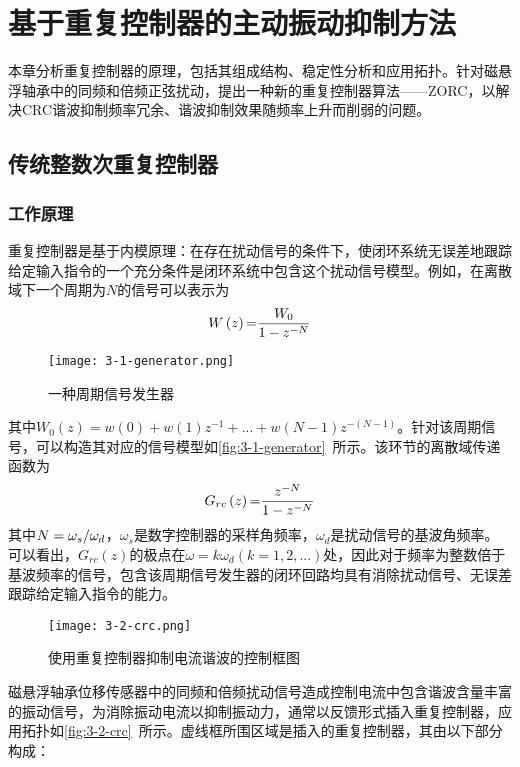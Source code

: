 \documentclass[
  lang=cn,
  degree=master,
  openany,oneside
]{nuaathesis}
\begin{document}
\chapter{基于重复控制器的主动振动抑制方法}
本章分析重复控制器的原理，包括其组成结构、稳定性分析和应用拓扑。针对磁悬浮轴承中的同频和倍频正弦扰动，提出一种新的重复控制器算法——ZORC，以解决CRC谐波抑制频率冗余、谐波抑制效果随频率上升而削弱的问题。

\section{传统整数次重复控制器}
\subsection{工作原理}
重复控制器是基于内模原理\cite{francis1975internal}：在存在扰动信号的条件下，使闭环系统无误差地跟踪给定输入指令的一个充分条件是闭环系统中包含这个扰动信号模型。例如，在离散域下一个周期为$N$的信号可以表示为
\begin{equation}
\label{eq3-1}
W\left( z \right){\rm{ = }}{{{W_0}} \over {1 - {z^{ - N}}}}
\end{equation}
\begin{figure}[h!]
	\texttt{[image: 3-1-generator.png]}
	\caption{一种周期信号发生器}
	\label{fig:3-1-generator}
\end{figure}
其中${W_0}\left( z \right) = w\left( 0 \right) + w\left( 1 \right){z^{ - 1}} + ... + w\left( {N - 1} \right){z^{ - \left( {N - 1} \right)}}$。针对该周期信号，可以构造其对应的信号模型如\autoref{fig:3-1-generator}~所示。该环节的离散域传递函数为
\begin{equation}
\label{eq3-2}
{G_{rc}}\left( z \right){\rm{ = }}{{{z^{ - N}}} \over {1 - {z^{ - N}}}}
\end{equation}
其中$N = {{{\omega _s}} \mathord{\left/
 {\vphantom {{{\omega _s}} {{\omega _d}}}} \right.
 \kern-\nulldelimiterspace} {{\omega _d}}}$，$\omega _s$是数字控制器的采样角频率，$\omega _d$是扰动信号的基波角频率。可以看出，$G_{rc}(z)$的极点在$\omega = k\omega_d(k = 1,2,...)$处，因此对于频率为整数倍于基波频率的信号，包含该周期信号发生器的闭环回路均具有消除扰动信号、无误差跟踪给定输入指令的能力。
 
\begin{figure}[h!]
	\texttt{[image: 3-2-crc.png]}
	\caption{使用重复控制器抑制电流谐波的控制框图}
	\label{fig:3-2-crc}
\end{figure}

磁悬浮轴承位移传感器中的同频和倍频扰动信号造成控制电流中包含谐波含量丰富的振动信号，为消除振动电流以抑制振动力，通常以反馈形式插入重复控制器，应用拓扑如\autoref{fig:3-2-crc}~所示。虚线框所围区域是插入的重复控制器，其由以下部分构成：
\end{document}
